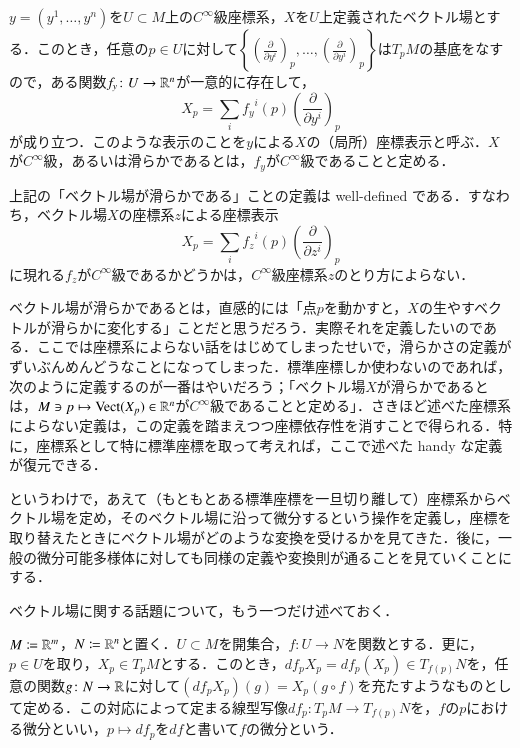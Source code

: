 \begin{defi}
$y = (y^1, \dots, y^n)$を$U \subset M$上の$C^\infty$級座標系，$X$を$U$上定義されたベクトル場とする．このとき，任意の$p \in U$に対して$\left\{ \left(\frac{\partial}{\partial y^i}\right)_p,\dots, \left(\frac{\partial}{\partial y^i}\right)_p \right\}$は$T_pM$の基底をなすので，ある関数$f_y \colon U \to \mathbb{R}^n$が一意的に存在して，
\begin{equation}
X_p = \sum_{i} {f_y}^i(p) \left( \frac{\partial}{\partial y^i} \right)_p
\end{equation}が成り立つ．このような表示のことを$y$による$X$の（局所）座標表示と呼ぶ．$X$が$C^\infty$級，あるいは滑らかであるとは，$f_y$が$C^\infty$級であることと定める．
\end{defi}

\begin{que}
上記の「ベクトル場が滑らかである」ことの定義は well-defined である．すなわち，ベクトル場$X$の座標系$z$による座標表示
\begin{equation}
X_p = \sum_{i} {f_z}^i(p) \left( \frac{\partial}{\partial z^i} \right)_p
\end{equation}
に現れる$f_z$が$C^\infty$級であるかどうかは，$C^\infty$級座標系$z$のとり方によらない．
\end{que}

\begin{que}
ベクトル場が滑らかであるとは，直感的には「点$p$を動かすと，$X$の生やすベクトルが滑らかに変化する」ことだと思うだろう．実際それを定義したいのである．ここでは座標系によらない話をはじめてしまったせいで，滑らかさの定義がずいぶんめんどうなことになってしまった．標準座標しか使わないのであれば，次のように定義するのが一番はやいだろう；「ベクトル場$X$が滑らかであるとは，$M \ni p \mapsto \operatorname{Vect}(X_p) \in \mathbb{R}^n$が$C^\infty$級であることと定める」．さきほど述べた座標系によらない定義は，この定義を踏まえつつ座標依存性を消すことで得られる．特に，座標系として特に標準座標を取って考えれば，ここで述べた handy な定義が復元できる．
\end{que}

というわけで，あえて（もともとある標準座標を一旦切り離して）座標系からベクトル場を定め，そのベクトル場に沿って微分するという操作を定義し，座標を取り替えたときにベクトル場がどのような変換を受けるかを見てきた．後に，一般の微分可能多様体に対しても同様の定義や変換則が通ることを見ていくことにする．

ベクトル場に関する話題について，もう一つだけ述べておく．
\begin{defi}
$M \coloneqq \mathbb{R}^m$，$N \coloneqq \mathbb{R}^n$と置く．$U \subset M$を開集合，$f \colon U \to N$を関数とする．更に，$p \in U$を取り，$X_p \in T_pM$とする．このとき，$df_p X_p = df_p (X_p) \in T_{f(p)}N$を，任意の関数$g \colon N \to \mathbb{R}$に対して$(df_pX_p)(g) = X_p(g \circ f)$を充たすようなものとして定める．この対応によって定まる線型写像$df_p \colon T_pM \to T_{f(p)}N$を，$f$の$p$における微分といい，$p \mapsto df_p$を$df$と書いて$f$の微分という．
\end{defi}

